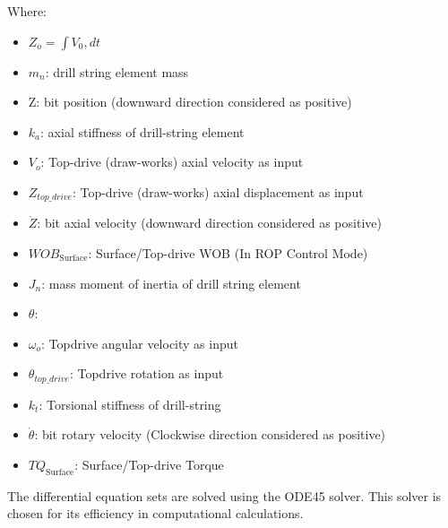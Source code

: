 Where:
\begin{itemize}
  \item $Z_o = \int V_0 , dt$ \\
  \item $m_n$: drill string element mass \\
  \item Z: bit position (downward direction considered as positive) \\
  \item $k_a$: axial stiffness of drill-string element \\
  \item $V_o$: Top-drive (draw-works) axial velocity as input \\
  \item $Z_{top\_drive}$: Top-drive (draw-works) axial displacement as input \\
  \item $\dot{Z}$: bit axial velocity (downward direction considered as positive) \\
  \item $WOB_{\text{Surface}}$: Surface/Top-drive WOB (In ROP Control Mode) \\
  \item $J_n$: mass moment of inertia of drill string element \\
  \item $\theta$:  \\
  \item $\omega_o$: Topdrive angular velocity as input \\
  \item $\theta_{top\_drive}$: Topdrive rotation as input \\
  \item $k_t$: Torsional stiffness of drill-string \\
  \item $\dot{\theta}$: bit rotary velocity (Clockwise direction considered as positive) \\
  \item $TQ_{\text{Surface}}$: Surface/Top-drive Torque \\
\end{itemize}


The differential equation sets are solved using the ODE45 solver. This solver is chosen for its efficiency in computational calculations.

